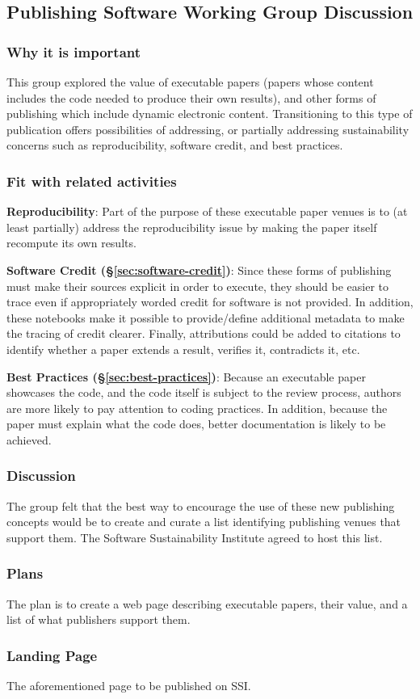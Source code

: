 \subsection{Publishing Software Working Group Discussion} \label{sec:publishing-software}

\subsubsection{Why it is important}

This group explored the value of executable papers (papers whose content
includes the code needed to produce their own results), and other forms of
publishing which include dynamic electronic content. Transitioning to this type
of publication offers possibilities of addressing, or partially addressing
sustainability concerns such as reproducibility, software credit, and best
practices.

\subsubsection{Fit with related activities}

\textbf{Reproducibility}: Part of the purpose of these executable paper venues
is to (at least partially) address the reproducibility issue by making the
paper itself recompute its own results.

\textbf{Software Credit (\S\ref{sec:software-credit})}: Since these forms of
publishing must make their sources explicit in order to execute, they should be
easier to trace even if appropriately worded credit for software is not
provided. In addition, these notebooks make it possible to provide/define
additional metadata to make the tracing of credit clearer. Finally,
attributions could be added to citations to identify whether a paper extends a
result, verifies it, contradicts it, etc.

\textbf{Best Practices (\S\ref{sec:best-practices})}: Because an executable paper
showcases the code, and the code itself is subject to the review process,
authors are more likely to pay attention to coding practices. In addition,
because the paper must explain what the code does, better documentation is
likely to be achieved.

\subsubsection{Discussion}

The group felt that the best way to encourage the use of these new publishing
concepts would be to create and curate a list identifying publishing venues
that support them. The Software Sustainability Institute agreed to host this list.

\subsubsection{Plans}

The plan is to create a web page describing executable papers, their value, and
a list of what publishers support them.

\subsubsection{Landing Page}

The aforementioned page to be published on SSI.
